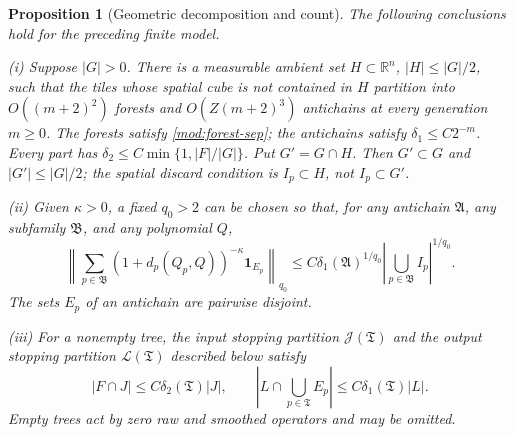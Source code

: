 \documentclass[11pt]{article}
\numberwithin{equation}{section}
\newtheorem{proposition}[theorem]{Proposition}
\theoremstyle{remark}
\theoremstyle{definition}
\newcommand{\R}{\mathbb R}
\newcommand{\TT}{\mathfrak T}
\begin{document}
\begin{proposition}[Geometric decomposition and count]\label{mod:geometry}
The following conclusions hold for the preceding finite model.

\smallskip\noindent
(i) Suppose $|G|>0$. There is a measurable ambient set $H\subset\R^n$,
$|H|\le|G|/2$, such that the tiles whose spatial cube is not contained
in $H$ partition into $O((m+2)^2)$ forests
and $O(Z(m+2)^3)$ antichains at every generation $m\ge0$. The forests
satisfy \eqref{mod:forest-sep}; the antichains satisfy
$\delta_1\le C2^{-m}$. Every part has
$\delta_2\le C\min\{1,|F|/|G|\}$. Put $G'=G\cap H$.
Then $G'\subset G$ and $|G'|\le|G|/2$; the spatial discard
condition is $I_p\subset H$, not $I_p\subset G'$.

\smallskip\noindent
(ii) Given $\kappa>0$, a fixed $q_0>2$ can be chosen so that, for any
antichain $\mathfrak A$, any subfamily $\mathfrak B$, and any polynomial
$Q$,
\begin{equation}\label{mod:antichain-count}
 \left\|\sum_{p\in\mathfrak B}(1+d_p(Q_p,Q))^{-\kappa}
 \mathbf1_{E_p}\right\|_{q_0}
 \le C\delta_1(\mathfrak A)^{1/q_0}
 \left|\bigcup_{p\in\mathfrak B}I_p\right|^{1/q_0}.
\end{equation}
The sets $E_p$ of an antichain are pairwise disjoint.

\smallskip\noindent
(iii) For a nonempty tree, the input stopping partition $\mathcal J(\TT)$
and the output stopping partition $\mathcal L(\TT)$ described below satisfy
\begin{equation}\label{mod:stopping-density}
 |F\cap J|\le C\delta_2(\TT)|J|,
 \qquad
 |L\cap\textstyle\bigcup_{p\in\TT}E_p|
 \le C\delta_1(\TT)|L|.
\end{equation}
Empty trees act by zero raw and smoothed operators and may be omitted.
\end{proposition}
\end{document}
